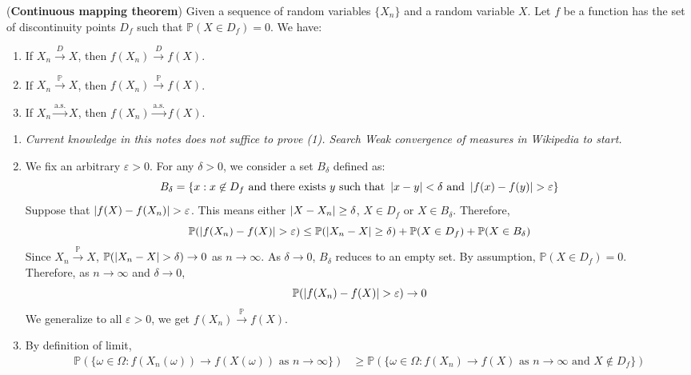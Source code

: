 \documentclass{huhtakm-template-book}
\newcommand{\prob}{\mathbb{P}}
\begin{document}
\newpage
\begin{thm}(\textbf{Continuous mapping theorem})
	Given a sequence of random variables $\{X_{n}\}$ and a random variable $X$. Let $f$ be a function has the set of discontinuity points $D_{f}$ such that $\prob(X\in D_{f})=0$. We have:
	\begin{enumerate}
		\item If $X_{n}\xrightarrow{D}X$, then $f(X_{n})\xrightarrow{D}f(X)$.
		\item If $X_{n}\xrightarrow{\prob}X$, then $f(X_{n})\xrightarrow{\prob}f(X)$.
		\item If $X_{n}\xrightarrow{\text{a.s.}}X$, then $f(X_{n})\xrightarrow{\text{a.s.}}f(X)$.
	\end{enumerate}
\end{thm}
\begin{proofing}
	\begin{enumerate}
		\item \textit{Current knowledge in this notes does not suffice to prove (1). Search Weak convergence of measures in Wikipedia to start.}
		\item We fix an arbitrary $\varepsilon>0$. For any $\delta>0$, we consider a set $B_{\delta}$ defined as:
		\begin{equation*}
			B_{\delta}=\{x:x\not\in D_{f}\text{ and there exists }y\text{ such that }\abs{x-y}<\delta\text{ and }\abs{f(x)-f(y)}>\varepsilon\}
		\end{equation*}
		Suppose that $\abs{f(X)-f(X_{n})}>\varepsilon$. This means either $\left|{X-X_{n}}\right|\geq\delta$, $X\in D_{f}$ or $X\in B_{\delta}$. Therefore,
		\begin{equation*}
			\prob(\abs{f(X_{n})-f(X)}>\varepsilon)\leq\prob(\abs{X_{n}-X}\geq\delta)+\prob(X\in D_{f})+\prob(X\in B_{\delta})
		\end{equation*}
		Since $X_{n}\xrightarrow{\prob}X$, $\prob(\abs{X_{n}-X}>\delta)\to 0$ as $n\to\infty$. As $\delta\to 0$, $B_{\delta}$ reduces to an empty set. By assumption, $\prob(X\in D_{f})=0$.\\
		Therefore, as $n\to\infty$ and $\delta\to 0$,
		\begin{equation*}
			\prob(\abs{f(X_{n})-f(X)}>\varepsilon)\to 0
		\end{equation*}
		We generalize to all $\varepsilon>0$, we get $f(X_{n})\xrightarrow{\prob}f(X)$.
		\item By definition of limit,
		\begin{align*}
			\prob(\{\omega\in\Omega:f(X_{n}(\omega))\to f(X(\omega))\text{ as }n\to\infty\})&\geq\prob(\{\omega\in\Omega:f(X_{n})\to f(X)\text{ as }n\to\infty\text{ and }X\not\in D_{f}\})\\

\end{align*}
\end{enumerate}
\end{proofing}
\end{document}
